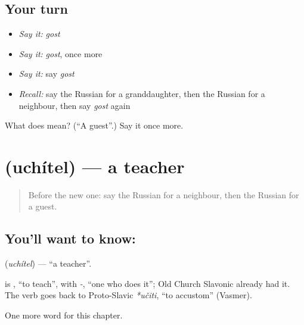 \subsection*{Your turn}
\begin{itemize}
\raggedright
  \item \emph{Say it:} \emph{gost}
  \item \emph{Say it:} \emph{gost}, once more
  \item \emph{Say it:} say \emph{gost}
  \item \emph{Recall:} say the Russian for a granddaughter, then the Russian for a neighbour, then say \emph{gost} again
\end{itemize}

\begin{tcolorbox}[breakable,colback=teal!4,colframe=teal!35!black,title={Before you move on}]
What does  mean? (\textquotedblleft{}A guest\textquotedblright{}.) Say it once more.
\end{tcolorbox}
\section[\texorpdfstring{\ru{учитель} (uchítel)}{учитель (uchítel)}]{ (uchítel) — a teacher}

\label{lesson:RU-C37-teacher}



\begin{quote}
Before the new one: say the Russian for a neighbour, then the Russian for a guest.
\end{quote}

\subsection*{You'll want to know: }
\textbf{} (\emph{uchítel}) — \textquotedblleft{}a teacher\textquotedblright{}.

\begin{cousinweb}
\textbf{} is \emph{}, \textquotedblleft{}to teach\textquotedblright{}, with \emph{-}, \textquotedblleft{}one who does it\textquotedblright{}; Old Church Slavonic already had it. The verb goes back to Proto-Slavic \emph{*učiti}, \textquotedblleft{}to accustom\textquotedblright{} (Vasmer).
\end{cousinweb}

\begin{grammarlens}[title={What you've built}]
One more word for this chapter.
\end{grammarlens}

